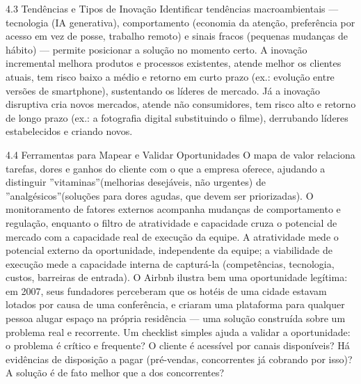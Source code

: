 4.3 Tendências e Tipos de Inovação Identificar tendências macroambientais — tecnologia (IA generativa), comportamento (economia da atenção, preferência por acesso em vez de posse, trabalho remoto) e sinais fracos (pequenas mudanças de hábito) — permite posicionar a solução no momento certo. A inovação incremental melhora produtos e processos existentes, atende melhor os clientes atuais, tem risco baixo a médio e retorno em curto prazo (ex.: evolução entre versões de smartphone), sustentando os líderes de mercado. Já a inovação disruptiva cria novos mercados, atende não consumidores, tem risco alto e retorno de longo prazo (ex.: a fotografia digital substituindo o filme), derrubando líderes estabelecidos e criando novos.

4.4 Ferramentas para Mapear e Validar Oportunidades O mapa de valor relaciona tarefas, dores e ganhos do cliente com o que a empresa oferece, ajudando a distinguir ”vitaminas”(melhorias desejáveis, não urgentes) de ”analgésicos”(soluções para dores agudas, que devem ser priorizadas). O monitoramento de fatores externos acompanha mudanças de comportamento e regulação, enquanto o filtro de atratividade e capacidade cruza o potencial de mercado com a capacidade real de execução da equipe. A atratividade mede o potencial externo da oportunidade, independente da equipe; a viabilidade de execução mede a capacidade interna de capturá-la (competências, tecnologia, custos, barreiras de entrada). O Airbnb ilustra bem uma oportunidade legítima: em 2007, seus fundadores perceberam que os hotéis de uma cidade estavam lotados por causa de uma conferência, e criaram uma plataforma para qualquer pessoa alugar espaço na própria residência — uma solução construída sobre um problema real e recorrente. Um checklist simples ajuda a validar a oportunidade: o problema é crítico e frequente? O cliente é acessível por canais disponíveis? Há evidências de disposição a pagar (pré-vendas, concorrentes já cobrando por isso)? A solução é de fato melhor que a dos concorrentes?

